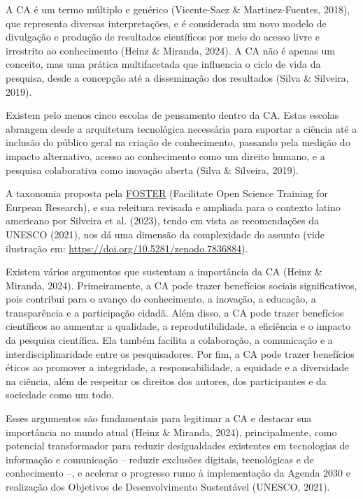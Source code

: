 \documentclass[
  a4paper,
]{article}
\begin{document}
A CA é um termo múltiplo e genérico (Vicente-Saez \& Martinez-Fuentes,
2018), que representa diversas interpretações, e é considerada um novo
modelo de divulgação e produção de resultados científicos por meio do
acesso livre e irrestrito ao conhecimento (Heinz \& Miranda, 2024). A CA
não é apenas um conceito, mas uma prática multifacetada que influencia o
ciclo de vida da pesquisa, desde a concepção até a disseminação dos
resultados (Silva \& Silveira, 2019).

Existem pelo menos cinco escolas de pensamento dentro da CA. Estas
escolas abrangem desde a arquitetura tecnológica necessária para
suportar a ciência até a inclusão do público geral na criação de
conhecimento, passando pela medição do impacto alternativo, acesso ao
conhecimento como um direito humano, e a pesquisa colaborativa como
inovação aberta (Silva \& Silveira, 2019).

A taxonomia proposta pela
\href{https://www.fosteropenscience.eu/foster-taxonomy/open-workflow-tools}{FOSTER}
(Facilitate Open Science Training for Eurpean Research), e sua releitura
revisada e ampliada para o contexto latino americano por Silveira et al.
(2023), tendo em vista as recomendações da UNESCO (2021), nos dá uma
dimensão da complexidade do assunto (vide ilustração em:
\url{https://doi.org/10.5281/zenodo.7836884}).

Existem vários argumentos que sustentam a importância da CA (Heinz \&
Miranda, 2024). Primeiramente, a CA pode trazer benefícios sociais
significativos, pois contribui para o avanço do conhecimento, a
inovação, a educação, a transparência e a participação cidadã. Além
disso, a CA pode trazer benefícios científicos ao aumentar a qualidade,
a reprodutibilidade, a eficiência e o impacto da pesquisa científica.
Ela também facilita a colaboração, a comunicação e a
interdisciplinaridade entre os pesquisadores. Por fim, a CA pode trazer
benefícios éticos ao promover a integridade, a responsabilidade, a
equidade e a diversidade na ciência, além de respeitar os direitos dos
autores, dos participantes e da sociedade como um todo.

Esses argumentos são fundamentais para legitimar a CA e destacar sua
importância no mundo atual (Heinz \& Miranda, 2024), principalmente,
como potencial transformador para reduzir desigualdades existentes em
tecnologias de informação e comunicação -- reduzir exclusões digitais,
tecnológicas e de conhecimento --, e acelerar o progresso rumo à
implementação da Agenda 2030 e realização dos Objetivos de
Desenvolvimento Sustentável (UNESCO, 2021).
\end{document}
